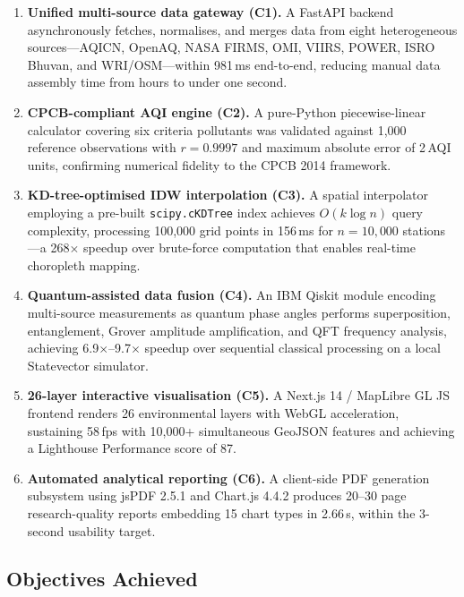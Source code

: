 \documentclass[12pt,a4paper]{article}
\begin{document}
\begin{enumerate}[leftmargin=*]
\item \textbf{Unified multi-source data gateway (C1).} A FastAPI backend
      asynchronously fetches, normalises, and merges data from eight
      heterogeneous sources---AQICN, OpenAQ, NASA FIRMS, OMI, VIIRS, POWER,
      ISRO Bhuvan, and WRI/OSM---within 981\,ms end-to-end, reducing manual
      data assembly time from hours to under one second.

\item \textbf{CPCB-compliant AQI engine (C2).} A pure-Python piecewise-linear
      calculator covering six criteria pollutants was validated against
      1,000 reference observations with $r = 0.9997$ and maximum absolute
      error of 2\,AQI units, confirming numerical fidelity to the CPCB 2014
      framework.

\item \textbf{KD-tree-optimised IDW interpolation (C3).} A spatial
      interpolator employing a pre-built \texttt{scipy.cKDTree} index
      achieves $O(k \log n)$ query complexity, processing 100,000 grid points
      in 156\,ms for $n = 10{,}000$ stations---a 268$\times$ speedup over
      brute-force computation that enables real-time choropleth mapping.

\item \textbf{Quantum-assisted data fusion (C4).} An IBM Qiskit module
      encoding multi-source measurements as quantum phase angles performs
      superposition, entanglement, Grover amplitude amplification, and QFT
      frequency analysis, achieving 6.9$\times$--9.7$\times$ speedup over
      sequential classical processing on a local Statevector simulator.

\item \textbf{26-layer interactive visualisation (C5).} A Next.js 14 /
      MapLibre GL JS frontend renders 26 environmental layers with WebGL
      acceleration, sustaining 58\,fps with 10,000+ simultaneous GeoJSON
      features and achieving a Lighthouse Performance score of 87.

\item \textbf{Automated analytical reporting (C6).} A client-side PDF
      generation subsystem using jsPDF 2.5.1 and Chart.js 4.4.2 produces
      20--30 page research-quality reports embedding 15 chart types in
      2.66\,s, within the 3-second usability target.
\end{enumerate}

\subsection{Objectives Achieved}
\label{sec:conclusion:objectives}
\end{document}
